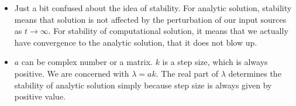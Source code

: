 \documentclass{article}
\theoremstyle{remark}
\begin{document}
\begin{itemize}
        \item Just a bit confused about the idea of stability. For analytic solution, stability means that solution is not affected by the perturbation of our input sources as $t\to\infty$. For stability of computational solution, it means that we actually have convergence to the analytic solution, that it does not blow up.
        \item $a$ can be complex number or a matrix. $k$ is a step size, which is always positive. We are concerned with $\lambda=ak$. The real part of $\lambda$ determines the stability of analytic solution simply because step size is always given by positive value.
\end{itemize}
\end{document}
